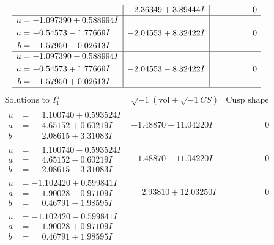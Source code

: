 \documentclass[1p]{elsarticle_modified}
\theoremstyle{definition}
\newcommand{\I}{\sqrt{-1}}
\begin{document}
$$\begin{array}{c|c|c}
 & -2.36349 + 3.89444 I & \phantom{-0.000000 } 0 \\ \hline\begin{aligned}
u &= -1.097390 + 0.588994 I \\
a &= -0.54573 - 1.77669 I \\
b &= -1.57950 - 0.02613 I\end{aligned}
 & -2.04553 + 8.32422 I & \phantom{-0.000000 } 0 \\ \hline\begin{aligned}
u &= -1.097390 - 0.588994 I \\
a &= -0.54573 + 1.77669 I \\
b &= -1.57950 + 0.02613 I\end{aligned}
 & -2.04553 - 8.32422 I & \phantom{-0.000000 } 0\\
 \hline 
 \end{array}$$\newpage$$\begin{array}{c|c|c}  
\text{Solutions to }I^u_{1}& \I (\text{vol} + \sqrt{-1}CS) & \text{Cusp shape}\\
 \hline 
\begin{aligned}
u &= \phantom{-}1.100740 + 0.593524 I \\
a &= \phantom{-}4.65152 + 0.60219 I \\
b &= \phantom{-}2.08615 + 3.31083 I\end{aligned}
 & -1.48870 - 11.04220 I & \phantom{-0.000000 } 0 \\ \hline\begin{aligned}
u &= \phantom{-}1.100740 - 0.593524 I \\
a &= \phantom{-}4.65152 - 0.60219 I \\
b &= \phantom{-}2.08615 - 3.31083 I\end{aligned}
 & -1.48870 + 11.04220 I & \phantom{-0.000000 } 0 \\ \hline\begin{aligned}
u &= -1.102420 + 0.599841 I \\
a &= \phantom{-}1.90028 - 0.97109 I \\
b &= \phantom{-}0.46791 - 1.98595 I\end{aligned}
 & \phantom{-}2.93810 + 12.03250 I & \phantom{-0.000000 } 0 \\ \hline\begin{aligned}
u &= -1.102420 - 0.599841 I \\
a &= \phantom{-}1.90028 + 0.97109 I \\
b &= \phantom{-}0.46791 + 1.98595 I\end{aligned}

\end{array}$$
\end{document}
